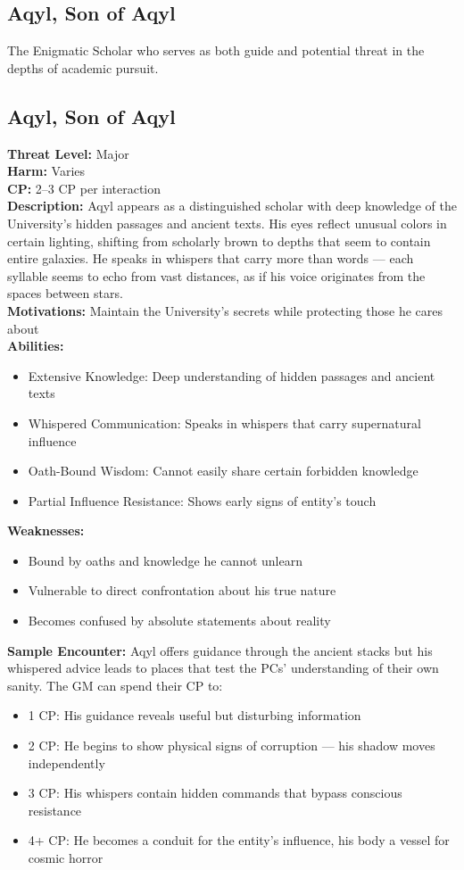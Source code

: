 \documentclass[11pt]{article}
\newenvironment{monsterentry}[1]{%
  \begin{mdframed}[backgroundcolor=shadecolor, linewidth=0pt, leftmargin=0pt, rightmargin=0pt]%
  \subsection*{#1}%
}{%
  \end{mdframed}%
}
\begin{document}
\subsection{Aqyl, Son of Aqyl}

The Enigmatic Scholar who serves as both guide and potential threat in the depths of academic pursuit.

\begin{monsterentry}{Aqyl, Son of Aqyl}
\textbf{Threat Level:} Major \\
\textbf{Harm:} Varies \\
\textbf{CP:} 2–3 CP per interaction \\
\textbf{Description:} Aqyl appears as a distinguished scholar with deep knowledge of the University's hidden passages and ancient texts. His eyes reflect unusual colors in certain lighting, shifting from scholarly brown to depths that seem to contain entire galaxies. He speaks in whispers that carry more than words — each syllable seems to echo from vast distances, as if his voice originates from the spaces between stars. \\
\textbf{Motivations:} Maintain the University's secrets while protecting those he cares about \\
\textbf{Abilities:}
\begin{itemize}
    \item Extensive Knowledge: Deep understanding of hidden passages and ancient texts
    \item Whispered Communication: Speaks in whispers that carry supernatural influence
    \item Oath-Bound Wisdom: Cannot easily share certain forbidden knowledge
    \item Partial Influence Resistance: Shows early signs of entity's touch
\end{itemize}
\textbf{Weaknesses:}
\begin{itemize}
    \item Bound by oaths and knowledge he cannot unlearn
    \item Vulnerable to direct confrontation about his true nature
    \item Becomes confused by absolute statements about reality
\end{itemize}
\textbf{Sample Encounter:} Aqyl offers guidance through the ancient stacks but his whispered advice leads to places that test the PCs' understanding of their own sanity. The GM can spend their CP to:
\begin{itemize}
    \item 1 CP: His guidance reveals useful but disturbing information
    \item 2 CP: He begins to show physical signs of corruption — his shadow moves independently
    \item 3 CP: His whispers contain hidden commands that bypass conscious resistance
    \item 4+ CP: He becomes a conduit for the entity's influence, his body a vessel for cosmic horror
\end{itemize}
\end{monsterentry}
\end{document}

